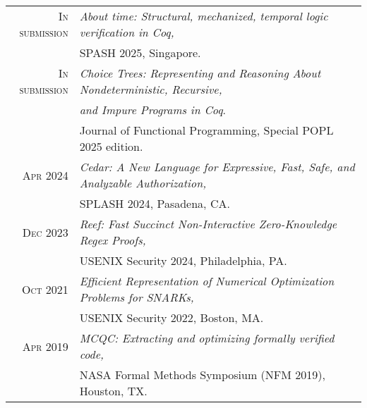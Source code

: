 \begin{tabular}{rl}
\textsc{In submission}& \emph{About time: Structural, mechanized, temporal logic verification in Coq,}\\
                      & SPASH 2025, Singapore.  \\[0.5em]
\textsc{In submission}& \emph{Choice Trees: Representing and Reasoning About Nondeterministic, Recursive,} \\
                      & \emph{and Impure Programs in Coq}. \\
                      & Journal of Functional Programming, Special POPL 2025 edition.  \\[0.5em]
\textsc{Apr} 2024 & \emph{Cedar: A New Language for Expressive, Fast, Safe, and Analyzable Authorization,} \\
                  & SPLASH 2024, Pasadena, CA.  \\[0.5em]
\textsc{Dec} 2023 & \emph{Reef: Fast Succinct Non-Interactive Zero-Knowledge Regex Proofs,} \\
                  & USENIX Security 2024, Philadelphia, PA.  \\[0.5em]
\textsc{Oct} 2021 & \emph{Efficient Representation of Numerical Optimization Problems for SNARKs,} \\
                  & USENIX Security 2022, Boston, MA.  \\[0.5em]
\textsc{Apr} 2019 & \emph{MCQC: Extracting and optimizing formally verified code,} \\
                  & NASA Formal Methods Symposium (NFM 2019), Houston, TX. \\
\end{tabular}
